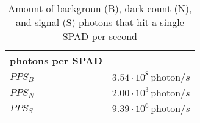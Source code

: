 \begin{table}[H]
\centering
\caption{Amount of backgroun (B), dark count (N), and signal (S) photons that hit a single SPAD per second}
\label{tab:photons_per_SPAD}
\begin{tabular}{|l|r|}\hline
    \textbf{photons per SPAD} & \\
    \hline 
    $PPS_B$ & $3.54\cdot10^{8}\, \text{photon}/s$ \\
    $PPS_N$ & $2.00\cdot10^{3}\, \text{photon}/s$ \\
    $PPS_S$ & $9.39\cdot10^{6}\, \text{photon}/s$ \\
    \hline 
\end{tabular}
\end{table}

